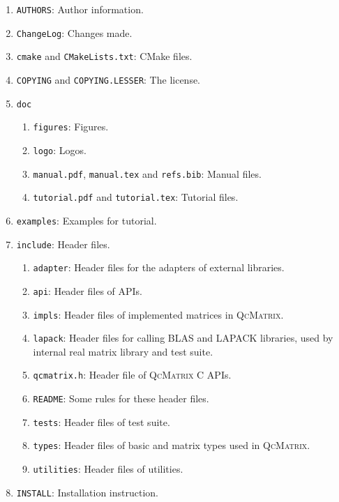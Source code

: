 \documentclass[a4paper,11pt,twoside,openright]{book}
\begin{document}
\begin{enumerate}
  \item \verb|AUTHORS|: Author information.
  \item \verb|ChangeLog|: Changes made.
  \item {\color{blue}\verb|cmake|} and \verb|CMakeLists.txt|: CMake files.
  \item \verb|COPYING| and \verb|COPYING.LESSER|: The license.
  \item {\color{blue}\verb|doc|}
    \begin{enumerate}
      \item {\color{blue}\verb|figures|}: Figures.
      \item {\color{blue}\verb|logo|}: Logos.
      \item \verb|manual.pdf|, \verb|manual.tex| and \verb|refs.bib|: Manual files.
      \item \verb|tutorial.pdf| and \verb|tutorial.tex|: Tutorial files.
    \end{enumerate}
  \item {\color{blue}\verb|examples|}: Examples for tutorial.
  \item {\color{blue}\verb|include|}: Header files.
    \begin{enumerate}
      \item {\color{blue}\verb|adapter|}: Header files for the adapters of %
        external libraries.
      \item {\color{blue}\verb|api|}: Header files of APIs.
      \item {\color{blue}\verb|impls|}: Header files of implemented matrices %
        in \textsc{QcMatrix}.
      \item {\color{blue}\verb|lapack|}: Header files for calling BLAS and %
        LAPACK libraries, used by internal real matrix library and test suite.
      \item \verb|qcmatrix.h|: Header file of \textsc{QcMatrix} C APIs.
      \item \verb|README|: Some rules for these header files.
      \item {\color{blue}\verb|tests|}: Header files of test suite.
      \item {\color{blue}\verb|types|}: Header files of basic and matrix types %
        used in \textsc{QcMatrix}.
      \item {\color{blue}\verb|utilities|}: Header files of utilities.
    \end{enumerate}
  \item \verb|INSTALL|: Installation instruction.

\end{enumerate}
\end{document}
